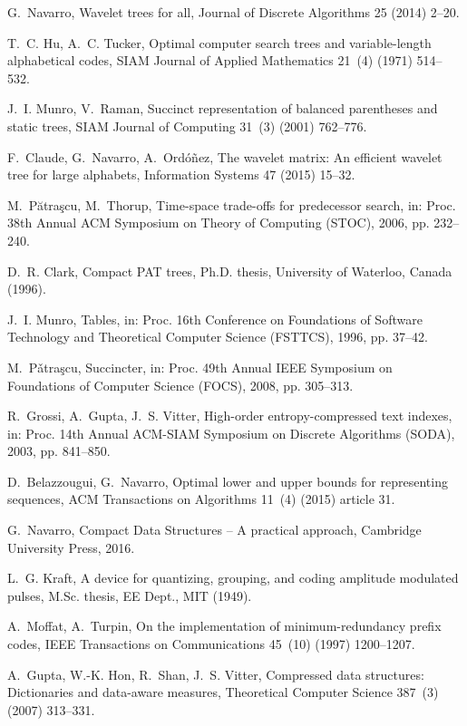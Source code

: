 \documentclass[preprint,12pt]{elsarticle}
\begin{document}
\begin{thebibliography}{10}
G.~Navarro, Wavelet trees for all, Journal of Discrete Algorithms 25 (2014)
  2--20.

T.~C. Hu, A.~C. Tucker, Optimal computer search trees and variable-length
  alphabetical codes, SIAM Journal of Applied Mathematics 21~(4) (1971)
  514--532.

J.~I. Munro, V.~Raman, Succinct representation of balanced parentheses and
  static trees, SIAM Journal of Computing 31~(3) (2001) 762--776.

F.~Claude, G.~Navarro, A.~{Ord{\'o\~n}ez}, The wavelet matrix: An efficient
  wavelet tree for large alphabets, Information Systems 47 (2015) 15--32.

M.~P{\u{a}}tra\c{s}cu, M.~Thorup, Time-space trade-offs for predecessor search,
  in: Proc. 38th Annual ACM Symposium on Theory of Computing (STOC), 2006, pp.
  232--240.

D.~R. Clark, Compact {PAT} trees, Ph.D. thesis, University of Waterloo, Canada
  (1996).

J.~I. Munro, Tables, in: Proc. 16th Conference on Foundations of Software
  Technology and Theoretical Computer Science (FSTTCS), 1996, pp. 37--42.

M.~P\v{a}tra\c{s}cu, Succincter, in: Proc. 49th Annual IEEE Symposium on
  Foundations of Computer Science (FOCS), 2008, pp. 305--313.

R.~Grossi, A.~Gupta, J.~S. Vitter, High-order entropy-compressed text indexes,
  in: Proc. 14th Annual ACM-SIAM Symposium on Discrete Algorithms (SODA), 2003,
  pp. 841--850.

D.~Belazzougui, G.~Navarro, Optimal lower and upper bounds for representing
  sequences, ACM Transactions on Algorithms 11~(4) (2015) article 31.

G.~Navarro, Compact Data Structures -- A practical approach, Cambridge
  University Press, 2016.

L.~G. Kraft, A device for quantizing, grouping, and coding amplitude modulated
  pulses, {M.Sc.} thesis, EE Dept., MIT (1949).

A.~Moffat, A.~Turpin, On the implementation of minimum-redundancy prefix codes,
  IEEE Transactions on Communications 45~(10) (1997) 1200--1207.

A.~Gupta, W.-K. Hon, R.~Shan, J.~S. Vitter, Compressed data structures:
  Dictionaries and data-aware measures, Theoretical Computer Science 387~(3)
  (2007) 313--331.


\end{thebibliography}
\end{document}

